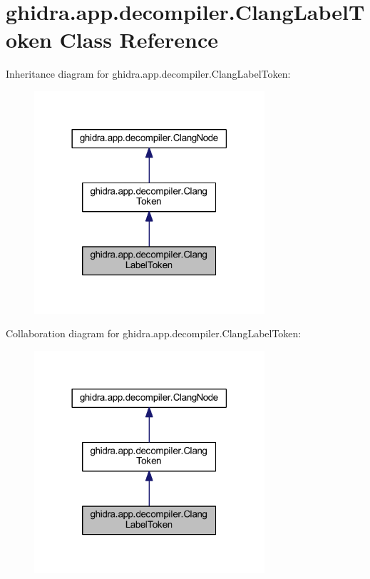 \hypertarget{classghidra_1_1app_1_1decompiler_1_1_clang_label_token}{}\section{ghidra.\+app.\+decompiler.\+Clang\+Label\+Token Class Reference}
\label{classghidra_1_1app_1_1decompiler_1_1_clang_label_token}


Inheritance diagram for ghidra.\+app.\+decompiler.\+Clang\+Label\+Token\+:
\nopagebreak
\begin{figure}[H]
\begin{center}
\leavevmode
\includegraphics[width=242pt]{classghidra_1_1app_1_1decompiler_1_1_clang_label_token__inherit__graph}
\end{center}
\end{figure}


Collaboration diagram for ghidra.\+app.\+decompiler.\+Clang\+Label\+Token\+:
\nopagebreak
\begin{figure}[H]
\begin{center}
\leavevmode
\includegraphics[width=242pt]{classghidra_1_1app_1_1decompiler_1_1_clang_label_token__coll__graph}
\end{center}
\end{figure}
